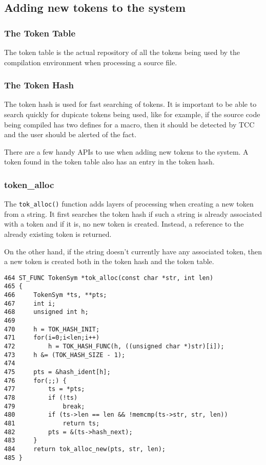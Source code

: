 \subsection{Adding new tokens to the system}

\subsubsection{The Token Table}

The token table is the actual repository of all the tokens being used by the compilation environment when processing a source file.

\subsubsection{The Token Hash}

The token hash is used for fast searching of tokens. It is important to be able to search quickly for dupicate tokens being used, like for example, if the source code being compiled has two defines for a macro, then it should be detected by TCC and the user should be alerted of the fact.

There are a few handy APIs to use when adding new tokens to the system. A token found in the token table also has an entry in the token hash.

\subsubsection{token\_alloc}

The \verb|tok_alloc()| function adds layers of processing when creating a new token from a string. It first searches the token hash if such a string is already associated with a token and if it is, no new token is created. Instead, a reference to the already existing token is returned.

On the other hand, if the string doesn't currently have any associated token, then a new token is created both in the token hash and the token table.

\begin{verbatim}
464 ST_FUNC TokenSym *tok_alloc(const char *str, int len)
465 {
466     TokenSym *ts, **pts;
467     int i;
468     unsigned int h;
469     
470     h = TOK_HASH_INIT;
471     for(i=0;i<len;i++)
472         h = TOK_HASH_FUNC(h, ((unsigned char *)str)[i]);
473     h &= (TOK_HASH_SIZE - 1);
474 
475     pts = &hash_ident[h];
476     for(;;) {
477         ts = *pts;
478         if (!ts)
479             break;
480         if (ts->len == len && !memcmp(ts->str, str, len))
481             return ts;
482         pts = &(ts->hash_next);
483     }
484     return tok_alloc_new(pts, str, len);
485 }
\end{verbatim}


